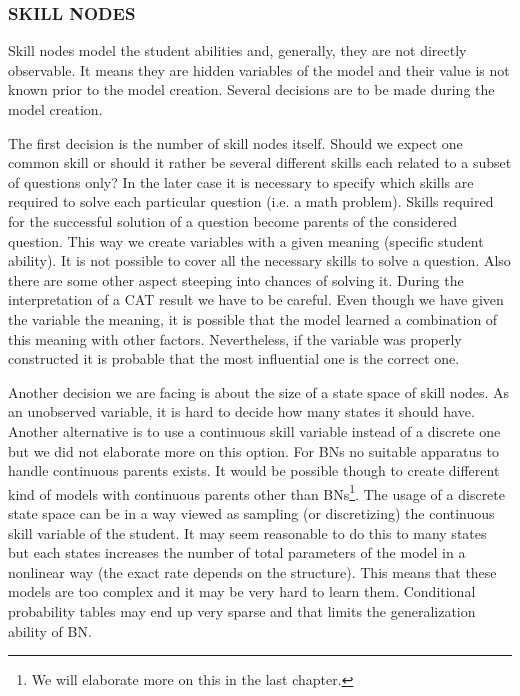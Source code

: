 \subsubsection{SKILL NODES}
Skill nodes model the student abilities and, generally, they are not directly observable. It means they are hidden variables of the model and their value is not known prior to the model creation. Several decisions are to be made during the model creation.
 
The first decision is the number of skill nodes itself. Should we expect one common skill or should it rather be several different skills each related to a subset of questions only? In the later case it is necessary to specify which skills are required to solve each particular question (i.e. a math problem). 
Skills required for the successful solution of a question become parents of the considered question. This way we create variables with a given meaning (specific student ability). It is not possible to cover all the necessary skills to solve a question. Also there are some other aspect steeping into chances of solving it. During the interpretation of a CAT result we have to be careful. Even though we have given the variable the meaning, it is possible that the model learned a combination of this meaning with other factors. Nevertheless, if the variable was properly constructed it is probable that the most influential one is the correct one.

Another decision we are facing is about the size of a state space of skill nodes. As an unobserved variable, it is hard to decide how many states it should have. Another alternative is to use a continuous skill variable instead of a discrete one but we did not elaborate more 
on this option. For BNs no suitable apparatus to handle continuous parents exists. It would be possible though to create different kind of models with continuous parents other than BNs\footnote{We will elaborate more on this in the last chapter.}. The usage of a discrete state space can be in a way viewed as sampling (or discretizing) the continuous skill variable of the student. It may seem reasonable to do this to many states but each states increases the number of total parameters of the model in a nonlinear way (the exact rate depends on the structure). This means that these models are too complex and it may be very hard to learn them. Conditional probability tables may end up very sparse and that limits the generalization ability of BN. 

